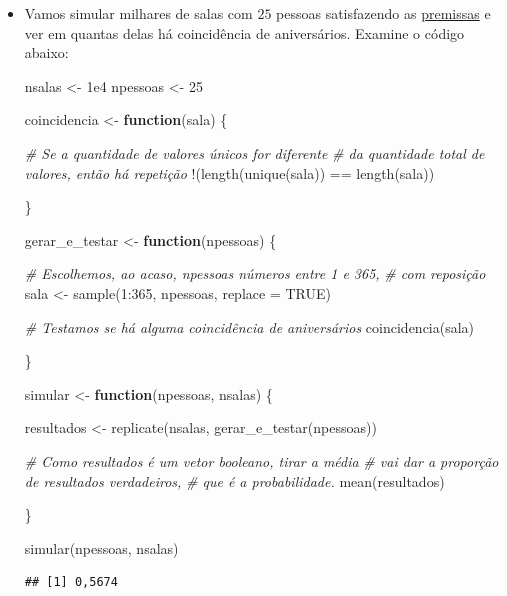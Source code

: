 \documentclass[
  11pt]{report}
\newenvironment{Shaded}{\begin{snugshade}}{\end{snugshade}}
\newcommand{\AttributeTok}[1]{\textcolor[rgb]{0.77,0.63,0.00}{#1}}
\newcommand{\CommentTok}[1]{\textcolor[rgb]{0.56,0.35,0.01}{\textit{#1}}}
\newcommand{\ConstantTok}[1]{\textcolor[rgb]{0.00,0.00,0.00}{#1}}
\newcommand{\ControlFlowTok}[1]{\textcolor[rgb]{0.13,0.29,0.53}{\textbf{#1}}}
\newcommand{\DecValTok}[1]{\textcolor[rgb]{0.00,0.00,0.81}{#1}}
\newcommand{\FloatTok}[1]{\textcolor[rgb]{0.00,0.00,0.81}{#1}}
\newcommand{\FunctionTok}[1]{\textcolor[rgb]{0.00,0.00,0.00}{#1}}
\newcommand{\NormalTok}[1]{#1}
\newcommand{\OtherTok}[1]{\textcolor[rgb]{0.56,0.35,0.01}{#1}}
\newcommand{\SpecialCharTok}[1]{\textcolor[rgb]{0.00,0.00,0.00}{#1}}
\renewenvironment{Shaded}{
    \begin{mdframed}[%
      roundcorner=2pt,%
      innerleftmargin=5pt,%
      innerrightmargin=5pt,%
      topline=true,%
      leftline=true,%
      rightline=true,%
      bottomline=true,%
      linewidth=0.5pt,%
      linecolor=black!20,%
      backgroundcolor=black!2,%
      skipabove=2ex,%
      skipbelow=2.5ex%
    ]%
  }
  {
    \end{mdframed}
  }
\begin{document}
\begin{itemize}
\item
  Vamos simular milhares de salas com $25$ pessoas satisfazendo as \protect\hyperlink{premissas}{premissas} e ver em quantas delas há coincidência de aniversários. Examine o código abaixo:

\begin{Shaded}
\begin{Highlighting}[]
\NormalTok{nsalas }\OtherTok{\textless{}{-}} \FloatTok{1e4}
\NormalTok{npessoas }\OtherTok{\textless{}{-}} \DecValTok{25}

\NormalTok{coincidencia }\OtherTok{\textless{}{-}} \ControlFlowTok{function}\NormalTok{(sala) \{}

  \CommentTok{\# Se a quantidade de valores únicos for diferente }
  \CommentTok{\# da quantidade total de valores, então há repetição  }
  \SpecialCharTok{!}\NormalTok{(}\FunctionTok{length}\NormalTok{(}\FunctionTok{unique}\NormalTok{(sala)) }\SpecialCharTok{==} \FunctionTok{length}\NormalTok{(sala))}

\NormalTok{\}}

\NormalTok{gerar\_e\_testar }\OtherTok{\textless{}{-}} \ControlFlowTok{function}\NormalTok{(npessoas) \{}

  \CommentTok{\# Escolhemos, ao acaso, npessoas números entre 1 e 365,}
  \CommentTok{\# com reposição}
\NormalTok{  sala }\OtherTok{\textless{}{-}} \FunctionTok{sample}\NormalTok{(}\DecValTok{1}\SpecialCharTok{:}\DecValTok{365}\NormalTok{, npessoas, }\AttributeTok{replace =} \ConstantTok{TRUE}\NormalTok{)}

  \CommentTok{\# Testamos se há alguma coincidência de aniversários}
  \FunctionTok{coincidencia}\NormalTok{(sala)}

\NormalTok{\}}

\NormalTok{simular }\OtherTok{\textless{}{-}} \ControlFlowTok{function}\NormalTok{(npessoas, nsalas) \{}

\NormalTok{  resultados }\OtherTok{\textless{}{-}} \FunctionTok{replicate}\NormalTok{(nsalas, }\FunctionTok{gerar\_e\_testar}\NormalTok{(npessoas))}

  \CommentTok{\# Como resultados é um vetor booleano, tirar a média}
  \CommentTok{\# vai dar a proporção de resultados verdadeiros,}
  \CommentTok{\# que é a probabilidade.}
  \FunctionTok{mean}\NormalTok{(resultados)}

\NormalTok{\}}

\FunctionTok{simular}\NormalTok{(npessoas, nsalas)}
\end{Highlighting}
\end{Shaded}

\begin{verbatim}
## [1] 0,5674
\end{verbatim}
\end{itemize}
\end{document}
